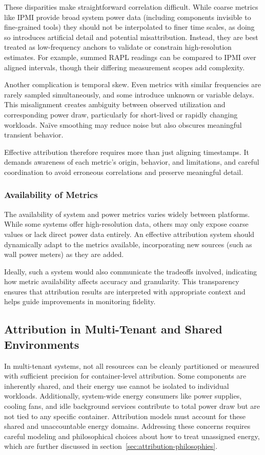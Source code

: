 These disparities make straightforward correlation difficult. While coarse metrics like IPMI provide broad system power data (including components invisible to fine-grained tools) they should not be interpolated to finer time scales, as doing so introduces artificial detail and potential misattribution. Instead, they are best treated as low-frequency anchors to validate or constrain high-resolution estimates. For example, summed RAPL readings can be compared to IPMI over aligned intervals, though their differing measurement scopes add complexity.

Another complication is temporal skew. Even metrics with similar frequencies are rarely sampled simultaneously, and some introduce unknown or variable delays. This misalignment creates ambiguity between observed utilization and corresponding power draw, particularly for short-lived or rapidly changing workloads. Naïve smoothing may reduce noise but also obscures meaningful transient behavior.

Effective attribution therefore requires more than just aligning timestamps. It demands awareness of each metric’s origin, behavior, and limitations, and careful coordination to avoid erroneous correlations and preserve meaningful detail.

\subsubsection*{Availability of Metrics}

The availability of system and power metrics varies widely between platforms. While some systems offer high-resolution data, others may only expose coarse values or lack direct power data entirely. An effective attribution system should dynamically adapt to the metrics available, incorporating new sources (such as wall power meters) as they are added.

Ideally, such a system would also communicate the tradeoffs involved, indicating how metric availability affects accuracy and granularity. This transparency ensures that attribution results are interpreted with appropriate context and helps guide improvements in monitoring fidelity.

\subsection*{Attribution in Multi-Tenant and Shared Environments}
\label{sec:shared_envs}

In multi-tenant systems, not all resources can be cleanly partitioned or measured with sufficient precision for container-level attribution. Some components are inherently shared, and their energy use cannot be isolated to individual workloads. Additionally, system-wide energy consumers like power supplies, cooling fans, and idle background services contribute to total power draw but are not tied to any specific container. Attribution models must account for these shared and unaccountable energy domains. Addressing these concerns requires careful modeling and philosophical choices about how to treat unassigned energy, which are further discussed in section~\ref{sec:attribution-philosophies}.

